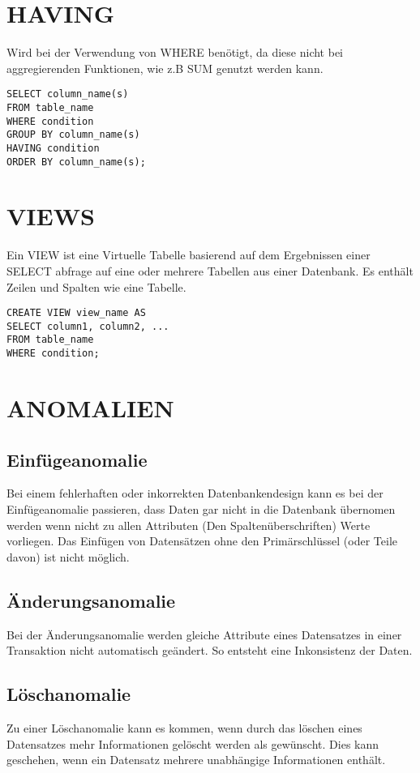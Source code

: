 \documentclass[fleqn,10pt]{SelfArx} %
\begin{document}
\section{HAVING}
Wird bei der Verwendung von WHERE benötigt, da diese nicht bei aggregierenden Funktionen, wie z.B SUM genutzt werden kann. 
\begin{verbatim}
SELECT column_name(s)
FROM table_name
WHERE condition
GROUP BY column_name(s)
HAVING condition
ORDER BY column_name(s);	
\end{verbatim}


\section{VIEWS}
Ein VIEW ist eine Virtuelle Tabelle basierend auf dem Ergebnissen einer SELECT abfrage auf eine oder mehrere Tabellen aus einer Datenbank.
Es enthält Zeilen und Spalten wie eine Tabelle.

\begin{verbatim}
CREATE VIEW view_name AS
SELECT column1, column2, ...
FROM table_name
WHERE condition;
\end{verbatim}

\section{ANOMALIEN}

\subsection{Einfügeanomalie}
Bei einem fehlerhaften oder inkorrekten Datenbankendesign kann es bei der Einfügeanomalie passieren, dass Daten gar nicht in die Datenbank übernomen werden wenn nicht zu allen Attributen (Den Spaltenüberschriften) Werte vorliegen. Das Einfügen von Datensätzen ohne den Primärschlüssel (oder Teile davon) ist nicht möglich. 

\subsection{Änderungsanomalie}
Bei der Änderungsanomalie werden gleiche Attribute eines Datensatzes in einer Transaktion nicht automatisch geändert. So entsteht eine Inkonsistenz der Daten. 

\subsection{Löschanomalie}
Zu einer Löschanomalie kann es kommen, wenn durch das löschen eines Datensatzes mehr Informationen gelöscht werden als gewünscht. Dies kann geschehen, wenn ein Datensatz mehrere unabhängige Informationen enthält. 
\end{document}

